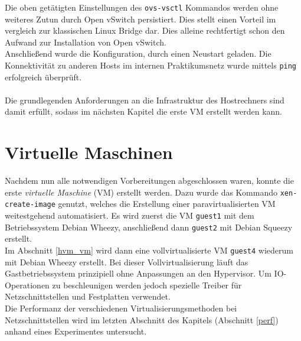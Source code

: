 Die oben getätigten Einstellungen des \verb#ovs-vsctl# Kommandos werden ohne weiteres Zutun durch Open vSwitch persistiert. Dies stellt einen Vorteil im vergleich zur klassischen Linux Bridge dar. Dies alleine rechtfertigt schon den Aufwand zur Installation von Open vSwitch. 
\\
Anschließend wurde die Konfiguration, durch einen Neustart geladen. Die Konnektivität zu anderen Hosts im internen Praktikumsnetz wurde mittels \verb#ping# erfolgreich überprüft.
\\
\\
Die grundlegenden Anforderungen an die Infrastruktur des Hostrechners sind damit erfüllt, sodass im nächsten Kapitel die erste VM erstellt werden kann.

\chapter{Virtuelle Maschinen}
Nachdem nun alle notwendigen Vorbereitungen abgeschlossen waren, konnte die erste \emph{virtuelle Maschine} (VM) erstellt werden. Dazu wurde das Kommando \verb#xen-create-image# genutzt, welches die Erstellung einer paravirtualisierten VM weitestgehend automatisiert. Es wird zuerst die VM \verb#guest1# mit dem Betriebssystem Debian Wheezy, anschließend dann \verb#guest2# mit Debian Squeezy erstellt.
\\
Im Abschnitt \ref{hvm_vm} wird dann eine vollvirtualisierte VM \verb#guest4# wiederum mit Debian Wheezy erstellt. Bei dieser Vollvirtualisierung läuft das Gastbetriebssystem prinzipiell ohne Anpassungen an den Hypervisor. Um IO-Operationen zu beschleunigen werden jedoch spezielle Treiber für Netzschnittstellen und Festplatten verwendet. 
\\
Die Performanz der verschiedenen Virtualisierungsmethoden bei Netzschnittstellen wird im letzten Abschnitt des Kapitels (Abschnitt \ref{perf}) anhand eines Experimentes untersucht.

